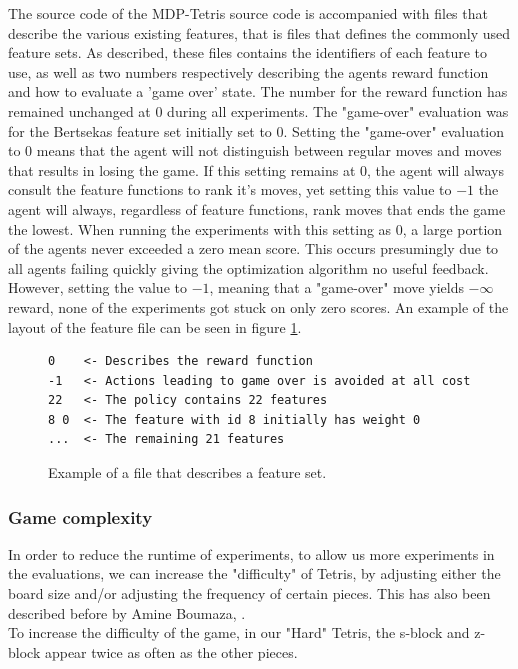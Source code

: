 The source code of the MDP-Tetris source code 
is accompanied with files that describe the
various existing features, that is files that defines 
the commonly used feature sets. As described, these files contains the identifiers of 
each feature to use, as well as two numbers respectively describing 
the agents reward function and how to evaluate a 'game over' state. 
The number for the reward function has remained unchanged at $0$ 
during all experiments. The "game-over" evaluation was for the
Bertsekas feature set initially set to $0$. Setting the 
"game-over" evaluation to $0$ means that the agent will not 
distinguish between regular moves and moves that results in losing
the game. If this setting remains at 0, the agent will always consult the
feature functions to rank it's moves, yet setting this value to $-1$
the agent will always, regardless of feature functions, rank moves that ends
the game the lowest.
When running the experiments with this setting as $0$, a large portion
of the agents never exceeded a zero mean score. This occurs presumingly 
due to all agents failing quickly giving the optimization algorithm no 
useful feedback. However, setting the value
to $-1$, meaning that a "game-over" move yields $-\infty$ reward, 
none of the experiments got stuck on only zero scores. An example
of the layout of the feature file can be seen in figure \ref{fig:featfile}.
\begin{figure}[h!]
\centering
\begin{lstlisting}
0    <- Describes the reward function
-1   <- Actions leading to game over is avoided at all cost
22   <- The policy contains 22 features
8 0  <- The feature with id 8 initially has weight 0
...  <- The remaining 21 features
\end{lstlisting}
\caption{Example of a file that describes a feature set. \label{fig:featfile}}
\end{figure}

\subsubsection{Game complexity \label{HardTetris}}
In order to reduce the runtime of experiments, to allow us more experiments in the evaluations, we can increase the "difficulty" of Tetris, by adjusting either the board size and/or adjusting the frequency of certain pieces. This has also been described before by Amine Boumaza, \citep{boumaza2009}.\\
To increase the difficulty of the game,
in our "Hard" Tetris, the s-block and z-block appear twice as often 
as the other pieces.

